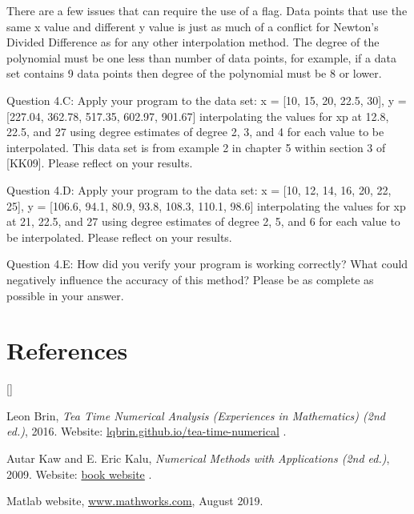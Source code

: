 \documentclass{article}
\renewcommand{\cite}[1]{[#1]}
\def\beginrefs{\begin{list}%
        {[\arabic{equation}]}{\usecounter{equation}
         \setlength{\leftmargin}{2.0truecm}\setlength{\labelsep}{0.4truecm}%
         \setlength{\labelwidth}{1.6truecm}}}
\def\endrefs{\end{list}}
\def\bibentry#1{\item[\hbox{[#1]}]}
\begin{document}
{\color{teal}There are a few issues that can require the use of a flag. Data points that use the same x value and different y value is just as much of a conflict for Newton's Divided Difference as for any other interpolation method. The degree of the polynomial must be one less than number of data points, for example, if a data set contains 9 data points then degree of the polynomial must be 8 or lower. }
\medskip \par \noindent
Question 4.C: Apply your program to the data set: x = [10, 15, 20, 22.5, 30], y = [227.04, 362.78, 517.35, 602.97, 901.67] interpolating the values for xp at 12.8, 22.5, and 27 using degree estimates of degree 2, 3, and 4 for each value to be interpolated. This data set is from example 2 in chapter 5 within section 3 of \cite{KK09}. Please reflect on your results. 
\medskip \par \noindent
Question 4.D: Apply your program
to the data set: x = [10, 12, 14, 16, 20, 22, 25], y = [106.6, 94.1, 80.9, 93.8, 108.3, 110.1, 98.6] interpolating the values for xp at 21, 22.5, and 27 using degree estimates of degree 2, 5, and 6 for each value to be interpolated. Please reflect on your results. 
\medskip \par \noindent
Question 4.E: How did you verify your program is working correctly? What could negatively influence the accuracy of this method?  Please be as complete as possible in your answer. 
\par \bigskip \par

\section*{References}
\beginrefs


\bibentry{LB16}{\sc Leon Brin},
{\it Tea Time Numerical Analysis (Experiences in Mathematics)  (2nd ed.)}, 2016. Website: \href{http://lqbrin.github.io/tea-time-numerical/}{lqbrin.github.io/tea-time-numerical} .

\bibentry{KK09} {\sc Autar Kaw} and {\sc E. Eric Kalu}, {\it Numerical Methods with Applications (2nd ed.)}, 2009. Website: \href{http://autarkaw.com/books/numericalmethods/index.html}{book website} .

\bibentry{Matlab} {\sc Matlab website}, \href{https://www.mathworks.com}{www.mathworks.com}, August 2019. %


\endrefs
\end{document}
